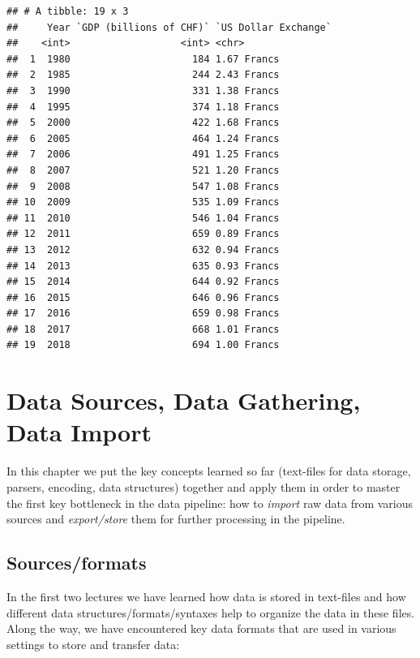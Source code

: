 \documentclass[
  12pt,
]{style/krantz}
\begin{document}
\begin{verbatim}
## # A tibble: 19 x 3
##     Year `GDP (billions of CHF)` `US Dollar Exchange`
##    <int>                   <int> <chr>               
##  1  1980                     184 1.67 Francs         
##  2  1985                     244 2.43 Francs         
##  3  1990                     331 1.38 Francs         
##  4  1995                     374 1.18 Francs         
##  5  2000                     422 1.68 Francs         
##  6  2005                     464 1.24 Francs         
##  7  2006                     491 1.25 Francs         
##  8  2007                     521 1.20 Francs         
##  9  2008                     547 1.08 Francs         
## 10  2009                     535 1.09 Francs         
## 11  2010                     546 1.04 Francs         
## 12  2011                     659 0.89 Francs         
## 13  2012                     632 0.94 Francs         
## 14  2013                     635 0.93 Francs         
## 15  2014                     644 0.92 Francs         
## 16  2015                     646 0.96 Francs         
## 17  2016                     659 0.98 Francs         
## 18  2017                     668 1.01 Francs         
## 19  2018                     694 1.00 Francs
\end{verbatim}

\hypertarget{data-sources-data-gathering-data-import}{%
\chapter{Data Sources, Data Gathering, Data Import}\label{data-sources-data-gathering-data-import}}

In this chapter we put the key concepts learned so far (text-files for data storage, parsers, encoding, data structures) together and apply them in order to master the first key bottleneck in the data pipeline: how to \emph{import} raw data from various sources and \emph{export/store} them for further processing in the pipeline.

\hypertarget{sourcesformats}{%
\section{Sources/formats}\label{sourcesformats}}

In the first two lectures we have learned how data is stored in text-files and how different data structures/formats/syntaxes help to organize the data in these files. Along the way, we have encountered key data formats that are used in various settings to store and transfer data:
\end{document}
